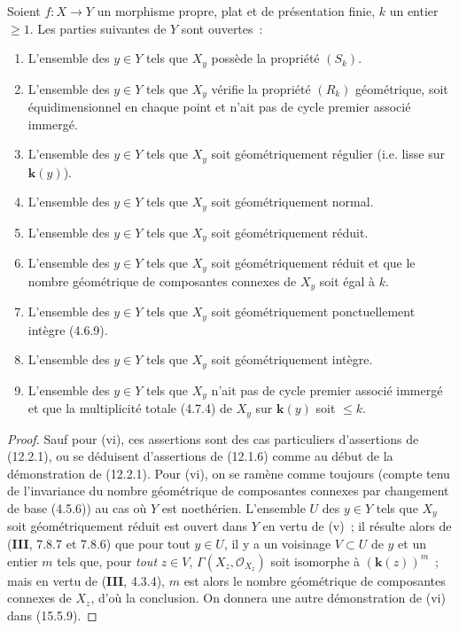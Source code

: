 \begin{theorem}[12.2.4]
\label{IV.12.2.4-fr}
Soient $f:X\to Y$ un morphisme propre, plat et de présentation finie, $k$ un
entier $\geq 1$. Les parties suivantes de $Y$ sont ouvertes~:
\begin{enumerate}[label=\textup{(\roman*)}]
  \item L'ensemble des $y\in Y$ tels que $X_y$ possède la propriété $(S_k)$.
  \item L'ensemble des $y\in Y$ tels que $X_y$ vérifie la propriété $(R_k)$
  géométrique, soit équidimensionnel en chaque point et n'ait pas de cycle
  premier associé immergé.
  \item L'ensemble des $y\in Y$ tels que $X_y$ soit géométriquement régulier
  \textup{(i.e.} lisse sur $\boldsymbol{k}(y)$\textup{)}.
  \item L'ensemble des $y\in Y$ tels que $X_y$ soit géométriquement normal.
  \item L'ensemble des $y\in Y$ tels que $X_y$ soit géométriquement réduit.
  \item L'ensemble des $y\in Y$ tels que $X_y$ soit géométriquement réduit et
  que le nombre géométrique de composantes connexes de $X_y$ soit égal à $k$.
  \item L'ensemble des $y\in Y$ tels que $X_y$ soit géométriquement
  ponctuellement intègre \textup{(4.6.9)}.
  \item L'ensemble des $y\in Y$ tels que $X_y$ soit géométriquement intègre.
  \item L'ensemble des $y\in Y$ tels que $X_y$ n'ait pas de cycle premier
  associé immergé et que la multiplicité totale \textup{(4.7.4)} de $X_y$ sur $\boldsymbol{k}(y)$
  soit $\leq k$.
\end{enumerate}
\end{theorem}

\begin{proof}
Sauf pour (vi), ces assertions sont des cas particuliers d'assertions de
(12.2.1), ou se déduisent d'assertions de (12.1.6) comme au début de la
démonstration de (12.2.1). Pour (vi), on se ramène comme toujours (compte tenu
de l'invariance du nombre géométrique de composantes connexes par changement
de base (4.5.6)) au cas où $Y$ est noethérien. L'ensemble $U$ des $y\in Y$ tels
que $X_y$ soit géométriquement réduit est ouvert dans $Y$ en vertu de (v)~; il
résulte alors de (\textbf{III}, 7.8.7 et 7.8.6) que pour tout $y\in U$, il y a
un voisinage $V\subset U$ de $y$ et un entier $m$ tels que, pour \emph{tout}
$z\in V$, $\Gamma(X_z,\mathcal O_{X_z})$ soit isomorphe à $(\boldsymbol{k}(z))^m$~; mais en
vertu de (\textbf{III}, 4.3.4), $m$ est alors le nombre géométrique de
composantes connexes de $X_z$, d'où la conclusion. On donnera une autre
démonstration de (vi) dans (15.5.9).
\end{proof}

